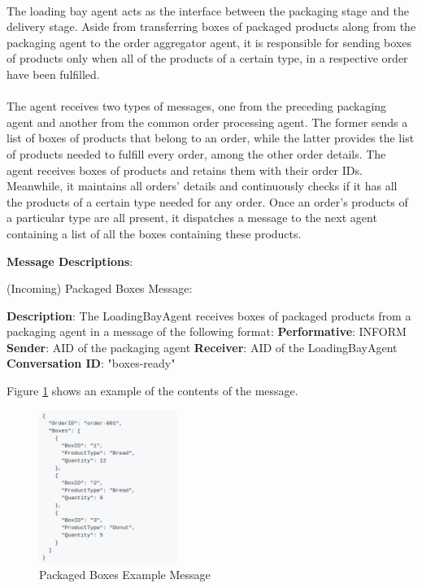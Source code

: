 \documentclass[11pt, a4paper]{article}
\begin{document}
\paragraph{}
The loading bay agent acts as the interface between the packaging stage and the delivery stage. Aside from transferring boxes of packaged products along from the packaging agent to the order aggregator agent, it is responsible for sending boxes of products only when all of the products of a certain type, in a respective order have been fulfilled.
\paragraph{}
The agent receives two types of messages, one from the preceding packaging agent and another from the common order processing agent. The former sends a list of boxes of products that belong to an order, while the latter provides the list of products needed to fulfill every order, among the other order details. The agent receives boxes of products and retains them with their order IDs. Meanwhile, it maintains all orders' details and continuously checks if it has all the products of a certain type needed for any order. Once an order's products of a particular type are all present, it dispatches a message to the next agent containing a list of all the boxes containing these products.
	
\pagebreak
\hfill\break
\textbf{Message Descriptions}:

\hfill\break
(Incoming) Packaged Boxes Message:

\hfill\break
\textbf{Description}:	
The LoadingBayAgent receives boxes of packaged products from a packaging agent in a message of the following format:
\hfill\break
\textbf{Performative}: INFORM
\hfill\break
\textbf{Sender}: AID of the packaging agent
\hfill\break
\textbf{Receiver}: AID of the LoadingBayAgent
\hfill\break	
\textbf{Conversation ID}: "boxes-ready"

\hfill\break
Figure \ref{loadingbaymsg1example} shows an example of the contents of the message.
\begin{figure}[h!]
	\centering
	\includegraphics[width=0.4\textwidth]{../images/loadingbaymsg1example.png}
	\caption{Packaged Boxes Example Message}
	\label{loadingbaymsg1example}
\end{figure}
\end{document}
